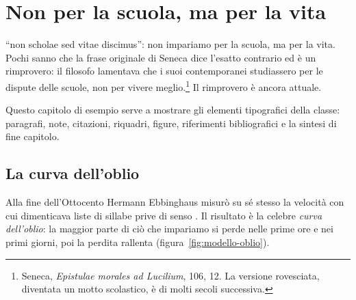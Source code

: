 \chapter{Non per la scuola, ma per la vita}
\label{cap:modello}


 \enquote{non scholae sed vitae discimus}:
non impariamo per la scuola, ma per la vita. Pochi sanno che la frase
originale di Seneca dice l'esatto contrario ed è un rimprovero: il
filosofo lamentava che i suoi contemporanei studiassero per le
dispute delle scuole, non per vivere meglio.\footnote{Seneca,
\emph{Epistulae morales ad Lucilium}, 106, 12. La versione rovesciata,
diventata un motto scolastico, è di molti secoli successiva.} Il
rimprovero è ancora attuale.

Questo capitolo di esempio serve a mostrare gli elementi tipografici
della classe: paragrafi, note, citazioni, riquadri, figure,
riferimenti bibliografici e la sintesi di fine capitolo.

\section{La curva dell'oblio}

Alla fine dell'Ottocento Hermann Ebbinghaus misurò su sé stesso la
velocità con cui dimenticava liste di sillabe prive di senso
\parencite{ebbinghaus1885}. Il risultato è la celebre \emph{curva
dell'oblio}: la maggior parte di ciò che impariamo si perde nelle prime
ore e nei primi giorni, poi la perdita rallenta
(figura~\ref{fig:modello-oblio}).

